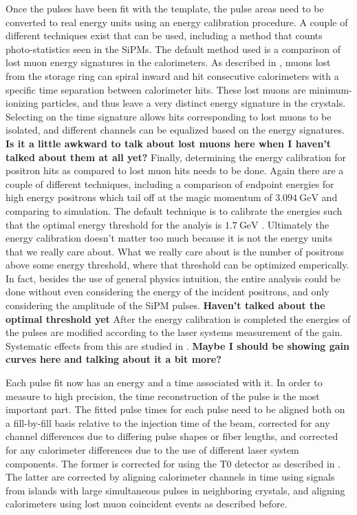 Once the pulses have been fit with the template, the pulse areas need to be converted to real energy units using an energy calibration procedure. A couple of different techniques exist that can be used, including a method that counts photo-statistics seen in the SiPMs. The default method used is a comparison of lost muon energy signatures in the calorimeters. As described in , muons lost from the storage ring can spiral inward and hit consecutive calorimeters with a specific time separation between calorimeter hits. These lost muons are minimum-ionizing particles, and thus leave a very distinct energy signature in the crystals. Selecting on the time signature allows hits corresponding to lost muons to be isolated, and different channels can be equalized based on the energy signatures. \textbf{Is it a little awkward to talk about lost muons here when I haven't talked about them at all yet?} Finally, determining the energy calibration for positron hits as compared to lost muon hits needs to be done. Again there are a couple of different techniques, including a comparison of endpoint energies for high energy positrons which tail off at the magic momentum of $\SI{3.094}{\GeV}$ and comparing to simulation. The default technique is to calibrate the energies such that the optimal energy threshold for the \wa analyis is $\SI{1.7}{\GeV}$ \cite{AFThesis}. Ultimately the energy calibration doesn't matter too much because it is not the energy units that we really care about. What we really care about is the number of positrons above some energy threshold, where that threshold can be optimized emperically. In fact, besides the use of general physics intuition, the entire \wa analysis could be done without even considering the energy of the incident positrons, and only considering the amplitude of the SiPM pulses. \textbf{Haven't talked about the optimal threshold yet} After the energy calibration is completed the energies of the pulses are modified according to the laser systems measurement of the gain. Systematic effects from this are studied in . \textbf{Maybe I should be showing gain curves here and talking about it a bit more?}


Each pulse fit now has an energy and a time associated with it. In order to measure \wa to high precision, the time reconstruction of the pulse is the most important part. The fitted pulse times for each pulse need to be aligned both on a fill-by-fill basis relative to the injection time of the beam, corrected for any channel differences due to differing pulse shapes or fiber lengths, and corrected for any calorimeter differences due to the use of different laser system components. The former is corrected for using the T0 detector as described in . The latter are corrected by aligning calorimeter channels in time using signals from islands with large simultaneous pulses in neighboring crystals, and aligning calorimeters using lost muon coincident events as described before.


